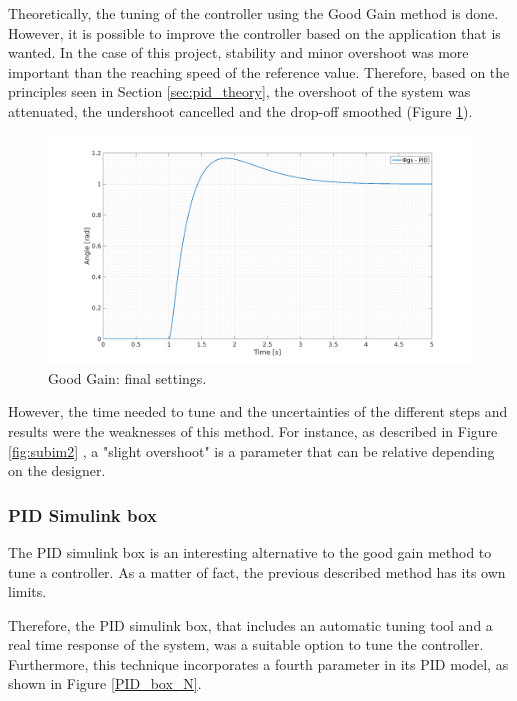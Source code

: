 \vspace{5mm}

Theoretically, the tuning of the controller using the Good Gain method is done. However, it is possible to improve the controller based on the application that is wanted. In the case of this project, stability and minor overshoot was more important than the reaching speed of the reference value. Therefore, based on the principles seen in Section \ref{sec:pid_theory}, the overshoot of the system was attenuated, the undershoot cancelled and the drop-off smoothed (Figure \ref{finalGG}).

\begin{figure}[H]
  \centerline{
  \includegraphics[scale=0.35]{figures/GG5.png}}
  \caption[LABEL] {Good Gain: final settings.}
  \label{finalGG}
\end{figure}

However, the time needed to tune and the uncertainties of the different steps and results were the weaknesses of this method. For instance, as described in Figure \ref{fig:subim2} , a "slight overshoot" is a parameter that can be relative depending on the designer.\par  
  
\subsubsection{PID Simulink box}
The PID simulink box is an interesting alternative to the good gain method to tune a controller. As a matter of fact, the previous described method has its own limits.\par 
  
Therefore, the PID simulink box, that includes an automatic tuning tool and a real time response of the system, was a suitable option to tune the controller. Furthermore, this technique incorporates a fourth parameter in its PID model, as shown in Figure \ref{PID_box_N}. 
 
